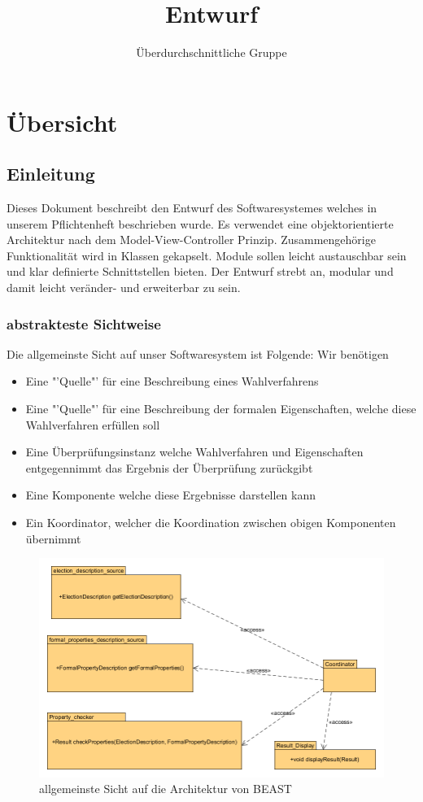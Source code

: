 \documentclass[a4paper]{scrreprt}
\begin{document}
\title{Entwurf}
\author{Überdurchschnittliche Gruppe}
\maketitle 
\chapter{Übersicht}
\section{Einleitung}
Dieses Dokument beschreibt den Entwurf des Softwaresystemes welches in unserem Pflichtenheft beschrieben wurde. Es verwendet eine objektorientierte Architektur nach dem Model-View-Controller Prinzip. Zusammengehörige Funktionalität wird in Klassen gekapselt. Module sollen leicht austauschbar sein und klar definierte Schnittstellen bieten. Der Entwurf strebt an, modular und damit leicht veränder- und erweiterbar zu sein.

\subsection{abstrakteste Sichtweise}
Die allgemeinste Sicht auf unser Softwaresystem ist Folgende: Wir benötigen
\begin{itemize}
\item Eine "'Quelle"' für eine Beschreibung eines Wahlverfahrens
\item Eine "'Quelle"' für eine Beschreibung der formalen Eigenschaften, welche diese Wahlverfahren erfüllen soll		
\item Eine Überprüfungsinstanz welche Wahlverfahren und Eigenschaften entgegennimmt das Ergebnis der Überprüfung zurückgibt
\item Eine Komponente welche diese Ergebnisse darstellen kann
\item Ein Koordinator, welcher die Koordination zwischen obigen Komponenten übernimmt
\end{itemize}

\begin{figure}[H]
\includegraphics[scale=0.5]{highest-level-general-view.png}
\caption{allgemeinste Sicht auf die Architektur von BEAST}
\label{most_general_view_of_beast_architecture}
\end{figure}
\end{document}
